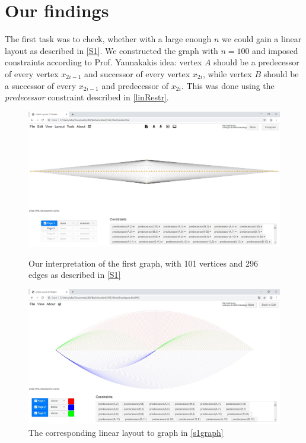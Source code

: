 \section{Our findings}
The first task was to check, whether with a large enough $n$  we could gain a linear layout as described in \autoref{S1}. We constructed the graph with $n = 100$ and imposed constraints according to Prof. Yannakakis idea: vertex $A$ should be a predecessor of every vertex $x_{2i-1}$ and successor of every vertex $x_{2i}$, while vertex $B$ should be a successor of every $x_{2i-1}$ and predecessor of $x_{2i}$. This was done using the \textit{predecessor} constraint described in \autoref{linRestr}.\\
\begin{figure}[h!]
\begin{center}
\includegraphics[width=1\textwidth]{figures/skeletonGraph101-296.jpg}
\caption{Our interpretation of the first graph, with 101 vertices and 296 edges as described in \autoref{S1}\label{s1graph}}
\vspace*{24pt}
\includegraphics[width=1\textwidth]{figures/skeletonGraph101-296-Solution.jpg}
\caption{The corresponding linear layout to graph in \autoref{s1graph}\label{s1sol}}
\end{center}
\end{figure}
